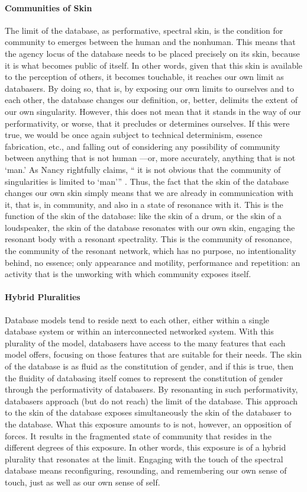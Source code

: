 \paragraph{Communities of Skin}
The limit of the database, as performative, spectral skin, is the condition for community to emerges between the human and the nonhuman. This means that the agency locus of the database needs to be placed precisely on its skin, because it is what becomes public of itself. In other words, given that this skin is available to the perception of others, it becomes touchable, it reaches our own limit as databasers. By doing so, that is, by exposing our own limits to ourselves and to each other, the database changes our definition, or, better, delimits the extent of our own singularity. However, this does not mean that it stands in the way of our performativity, or worse, that it precludes or determines ourselves. If this were true, we would be once again subject to technical determinism, essence fabrication, etc., and falling out of considering any possibility of community between anything that is not human ---or, more accurately, anything that is not `man.' As Nancy rightfully claims, `` it is not obvious that the community of singularities is limited to `man''' \cite[28]{Nan91:The}. Thus, the fact that the skin of the database changes our own skin simply means that we are already in communication with it, that is, in community, and also in a state of resonance with it. This is the function of the skin of the database: like the skin of a drum, or the skin of a loudspeaker, the skin of the database resonates with our own skin, engaging the resonant body with a resonant spectrality. This is the community of resonance, the community of the resonant network, which has no purpose, no intentionality behind, no essence; only appearance and motility, performance and repetition: an activity that is the unworking with which community exposes itself. 

\paragraph{Hybrid Pluralities}
Database models tend to reside next to each other, either within a single database system or within an interconnected networked system. With this plurality of the model, databasers have access to the many features that each model offers, focusing on those features that are suitable for their needs.  The skin of the database is as fluid as the constitution of gender, and if this is true, then the fluidity of databasing itself comes to represent the constitution of gender through the performativity of databasers. By resonanting in such performativity, databasers approach (but do not reach) the limit of the database. This approach to the skin of the database exposes simultaneously the skin of the databaser to the database. What this exposure amounts to is not, however, an opposition of forces. It results in the fragmented state of community that resides in the different degrees of this exposure. In other words, this exposure is of a hybrid plurality that resonates at the limit. Engaging with the touch of the spectral database means reconfiguring, resounding, and remembering our own sense of touch, just as well as our own sense of self.